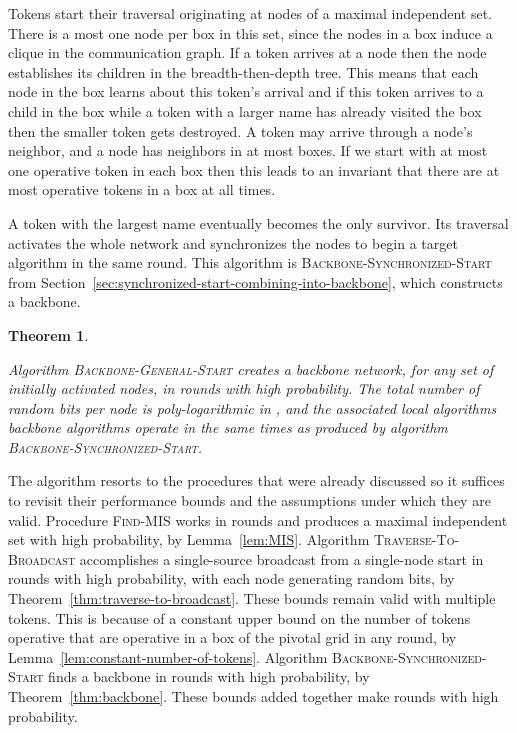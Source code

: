 \documentclass[11pt]{article}
\newcommand{\qed}{\hfill  \smallskip}
\newenvironment{proof}{\noindent{\bf Proof:}}{\qed}
\newtheorem{theorem}{Theorem}
\begin{document}
\begin{proof}
Tokens start their traversal originating at nodes of a maximal independent set.
There is a most one node per box in this set, since the nodes in a box induce a clique in the communication graph. 
If a token arrives at a node then the node  establishes its children in the breadth-then-depth tree.
This means that each node in the box learns about this token's arrival and if this token arrives to a child in the box while a token with a larger name has already visited the box then the smaller token gets destroyed.
A token may arrive  through a node's neighbor, and a node has neighbors in at most  boxes.
If we start with at most one operative token in each box then this leads to an invariant that there are at most  operative tokens in a box at all times.
\end{proof}




A token with the largest name eventually  becomes the only survivor. 
Its traversal activates the whole network and synchronizes the nodes to begin a target algorithm in the same round.
This algorithm is \textsc{Backbone-Synchronized-Start} from Section~\ref{sec:synchronized-start-combining-into-backbone},
which constructs a backbone.




\begin{theorem}
\label{thm:emulate-dfs}

Algorithm \textsc{Backbone-General-Start} creates a backbone network, for any set of initially activated nodes, in  rounds with high probability.
The total number of random bits per node is poly-logarithmic in , and the associated local algorithms backbone algorithms operate in the same times as produced by algorithm \textsc{Backbone-Synchronized-Start}.
\end{theorem}


\begin{proof}
The algorithm resorts to the procedures that were already discussed so it suffices to revisit their performance bounds and the assumptions under which they are valid.
Procedure  \textsc{Find-MIS} works in  rounds and produces a maximal independent set with high probability, by Lemma~\ref{lem:MIS}.
Algorithm  \textsc{Traverse-To-Broadcast} accomplishes a single-source broadcast from a single-node start in  rounds with high probability, with each node generating  random bits, by Theorem~\ref{thm:traverse-to-broadcast}.
These bounds remain valid with multiple tokens.
This is because of a constant upper bound on the number of  tokens operative that are operative in a box of the pivotal grid in any round, by Lemma~\ref{lem:constant-number-of-tokens}.
Algorithm \textsc{Backbone-Synchronized-Start} finds a backbone in  rounds with high probability, by Theorem~\ref{thm:backbone}.
These bounds added together make
 rounds with high probability.
\end{proof}
\end{document}
